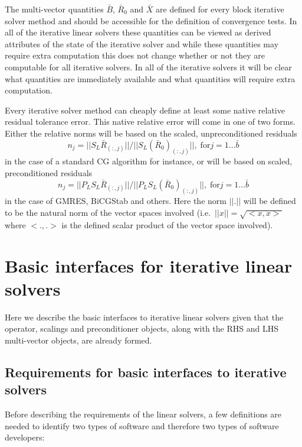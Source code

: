 \documentclass[pdf,ps2pdf,11pt]{SANDreport}
\begin{document}
The multi-vector quantities $\bar{B}$, $\bar{R}_0$ and $\bar{X}$ are
defined for every block iterative solver method and should be
accessible for the definition of convergence tests.  In all of the
iterative linear solvers these quantities can be viewed as derived
attributes of the state of the iterative solver and while these
quantities may require extra computation this does not change whether
or not they are computable for all iterative solvers.  In all of the
iterative solvers it will be clear what quantities are immediately
available and what quantities will require extra computation.

Every iterative solver method can cheaply define at least some native
relative residual tolerance error.  This native relative error will
come in one of two forms.  Either the relative norms will be based on
the scaled, unpreconditioned residuals
%
\begin{equation}
n_j = ||S_L \bar{R}_{(:,j)}|| / ||S_L (\bar{R}_0)_{(:,j)}||, \; \mbox{for} j = 1 \ldots \bar{b}
\label{belos:eqn:scaled_unprec_rel_norms}
\end{equation}
%
in the case of a standard CG algorithm for instance, or will be based
on scaled, preconditioned residuals
%
\begin{equation}
n_j = ||P_L S_L \bar{R}_{(:,j)}|| / ||P_L S_L (\bar{R}_0)_{(:,j)}||, \; \mbox{for} j = 1 \ldots \bar{b}
\label{belos:eqn:scaled_prec_rel_norms}
\end{equation}
%
in the case of GMRES, BiCGStab and others.  Here the norm $||.||$ will
be defined to be the natural norm of the vector spaces involved
(i.e.~$||x|| = {}\sqrt{<x,x>}$ where $<.,.>$ is the defined scalar
product of the vector space involved).

%
\section{Basic interfaces for iterative linear solvers}
%

Here we describe the basic interfaces to iterative linear solvers
given that the operator, scalings and preconditioner objects, along
with the RHS and LHS multi-vector objects, are already formed.

%
\subsection{Requirements for basic interfaces to iterative solvers}
\label{sec:requirements}
%

Before describing the requirements of the linear solvers, a few
definitions are needed to identify two types of software and therefore
two types of software developers:
\end{document}
